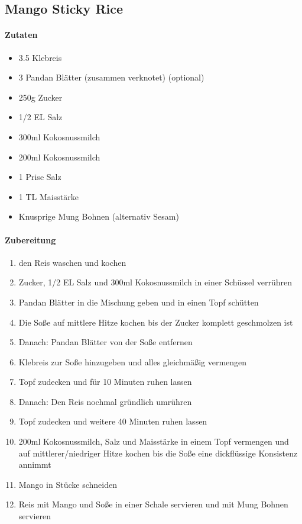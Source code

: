 \newpage
\subsection{Mango Sticky Rice}
\paragraph{Zutaten}
\begin{itemize}[noitemsep]
	\item 3.5 Klebreis
	\item 3 Pandan Blätter (zusammen verknotet) (optional)
	\item 250g Zucker
	\item 1/2 EL Salz
	\item 300ml Kokosnussmilch
	\vspace{0.5cm}
	\item 200ml Kokosnussmilch
	\item 1 Prise Salz
	\item 1 TL Maisstärke
	\item Knusprige Mung Bohnen (alternativ Sesam)
\end{itemize}
\paragraph{Zubereitung}
\begin{enumerate}[noitemsep]
	\item den Reis waschen und kochen
	\item Zucker, 1/2 EL Salz und 300ml Kokosnussmilch in einer Schüssel verrühren
	\item Pandan Blätter in die Mischung geben und in einen Topf schütten
	\item Die Soße auf mittlere Hitze kochen bis der Zucker komplett geschmolzen ist
	\item Danach: Pandan Blätter von der Soße entfernen
	\item Klebreis zur Soße hinzugeben und alles gleichmäßig vermengen
	\item Topf zudecken und für 10 Minuten ruhen lassen
	\item Danach: Den Reis nochmal gründlich umrühren 
	\item Topf zudecken und weitere 40 Minuten ruhen lassen
	\item 200ml Kokosnussmilch, Salz und Maisstärke in einem Topf vermengen und auf mittlerer/niedriger Hitze kochen bis die Soße eine dickflüssige Konsistenz annimmt
	\item Mango in Stücke schneiden
	\item Reis mit Mango und Soße in einer Schale servieren und mit Mung Bohnen servieren
\end{enumerate}
